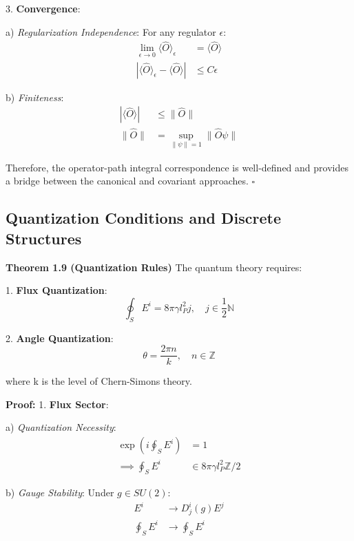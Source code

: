 \documentclass[12pt,a4paper]{article}
\begin{document}
3. \textbf{Convergence}:
   
   a) \textit{Regularization Independence}:
      For any regulator $\epsilon$:
      \[
      \begin{aligned}
      \lim_{\epsilon \to 0}\langle\hat{O}\rangle_\epsilon &= \langle\hat{O}\rangle \\
      |\langle\hat{O}\rangle_\epsilon - \langle\hat{O}\rangle| &\leq C\epsilon
      \end{aligned}
      \]
   
   b) \textit{Finiteness}:
      \[
      \begin{aligned}
      |\langle\hat{O}\rangle| &\leq \|\hat{O}\| \\
      \|\hat{O}\| &= \sup_{\|\psi\|=1} \|\hat{O}\psi\|
      \end{aligned}
      \]

Therefore, the operator-path integral correspondence is well-defined and provides a bridge between the canonical and covariant approaches. $\square$

\subsection{Quantization Conditions and Discrete Structures}

\textbf{Theorem 1.9 (Quantization Rules)}
The quantum theory requires:

1. \textbf{Flux Quantization}:
   \[
   \oint_S E^i = 8\pi\gamma l_P^2 j, \quad j \in \frac{1}{2}\mathbb{N}
   \]

2. \textbf{Angle Quantization}:
   \[
   \theta = \frac{2\pi n}{k}, \quad n \in \mathbb{Z}
   \]

where k is the level of Chern-Simons theory.

\textbf{Proof:}
1. \textbf{Flux Sector}:
   
   a) \textit{Quantization Necessity}:
      \[
      \begin{aligned}
      \exp(i\oint_S E^i) &= 1 \\
      \implies \oint_S E^i &\in 8\pi\gamma l_P^2\mathbb{Z}/2
      \end{aligned}
      \]
   
   b) \textit{Gauge Stability}:
      Under $g \in SU(2)$:
      \[
      \begin{aligned}
      E^i &\rightarrow D^i_j(g)E^j \\
      \oint_S E^i &\rightarrow \oint_S E^i
      \end{aligned}
      \]
\end{document}

